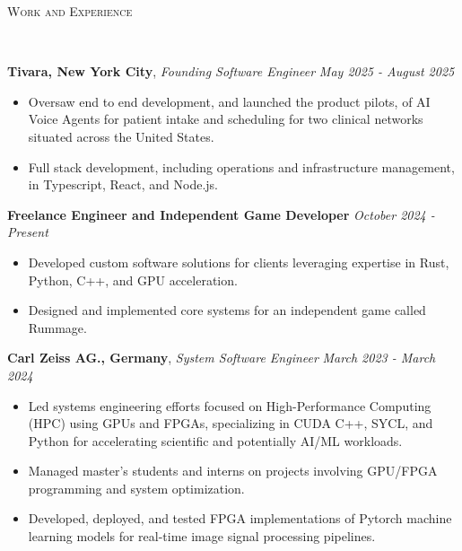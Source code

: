 \documentclass[8pt]{article}
\newenvironment{changemargin}[2]{%
  \begin{list}{}{%
    \setlength{\topsep}{0pt}%
    \setlength{\leftmargin}{#1}%
    \setlength{\rightmargin}{#2}%
    \setlength{\listparindent}{\parindent}%
    \setlength{\itemindent}{\parindent}%
    \setlength{\parsep}{0pt}%
    \setlength{\itemsep}{-2pt}%
  }%
  \item[]}{\end{list}
}
\newcommand{\lineover}{
	\begin{changemargin}{-0.05in}{-0.05in}
		\vspace*{-10pt}
		\hrulefill \\
		\vspace*{-4pt}
	\end{changemargin}
}
\newcommand{\header}[1]{
	\begin{changemargin}{-0.5in}{-0.5in}
		\scshape{#1}\\
  	\lineover
	\end{changemargin}
}
\newenvironment{body} {
	\vspace*{-10pt}
	\begin{changemargin}{-0.25in}{-0.5in}
  }	
	{\end{changemargin}
}
\begin{document}
\header{Work and Experience}
\begin{body}
	\vspace{10pt} %

	\textbf{Tivara, New York City}, \emph{Founding Software Engineer} \hfill \emph{May 2025 - August 2025}\\
	\vspace*{-6pt}
	\begin{itemize} \itemsep -2pt
		\item Oversaw end to end development, and launched the product pilots, of AI Voice Agents for patient intake and
		scheduling for two clinical networks situated across the United States.
		\item Full stack development, including operations and infrastructure management, in Typescript, React, and Node.js.
	\end{itemize}
	\vspace*{-6pt}

	\textbf{Freelance Engineer and Independent Game Developer} \hfill \emph{October 2024 - Present}\\
	\vspace*{-6pt}
	\begin{itemize} \itemsep -2pt
		\item Developed custom software solutions for clients leveraging expertise in Rust, Python, C++, and GPU acceleration.
		\item Designed and implemented core systems for an independent game called
		Rummage. 
	\end{itemize}
	\vspace*{-6pt}

	\textbf{Carl Zeiss AG., Germany}, \emph{System Software Engineer} \hfill \emph{March 2023 - March 2024}\\
	\vspace*{-6pt} %
	\begin{itemize} \itemsep -2pt %
		\item Led systems engineering efforts focused on High-Performance Computing (HPC) using GPUs and FPGAs, specializing in CUDA C++, SYCL, and Python for accelerating scientific and potentially AI/ML workloads.
		\item Managed master's students and interns on projects involving GPU/FPGA programming and system optimization.
		\item Developed, deployed, and tested FPGA implementations of Pytorch machine learning models for real-time image signal processing pipelines.
	\end{itemize}
	\vspace*{-6pt}


\end{body}
\end{document}
